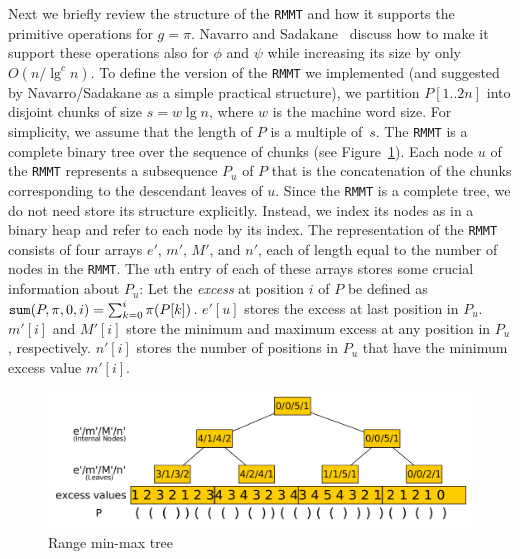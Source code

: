 Next we briefly review the structure of the {\tt RMMT} and how it supports
the primitive operations for $g = \pi$.
Navarro and Sadakane~\cite{Navarro:2014:FFS:2620785.2601073} discuss how
to make it support these operations also for $\phi$ and $\psi$ while increasing
its size by only $O(n/\lg^c n)$.
To define the version of the {\tt RMMT} we implemented (and suggested by
Navarro/Sadakane as a simple practical structure), we partition $P[1..2n]$ into
disjoint chunks of size $s = w \lg n$, where $w$ is the machine word size.
For simplicity, we assume that the length of $P$ is a multiple of~$s$.
The {\tt RMMT} is a complete binary tree over the sequence of chunks
(see Figure~\ref{fig:RangeMinMaxTree}).
Each node $u$ of the {\tt RMMT} represents a subsequence $P_u$ of $P$ that is
the concatenation of the chunks corresponding to the descendant leaves of $u$.
Since the {\tt RMMT} is a complete tree, we do not need store its structure
explicitly.
Instead, we index its nodes as in a binary heap and refer to each node by
its index.
The representation of the {\tt RMMT} consists of four arrays $e'$, $m'$,
$M'$, and $n'$, each of length equal to the number of nodes in the {\tt RMMT}.
The $u$th entry of each of these arrays stores some crucial information about
$P_u$:
Let the {\em excess} at position $i$ of $P$ be defined as $\mathtt{sum}(P,\pi,0,i) =
\sum_{k=0}^{i} \pi(P[k])$.
$e'[u]$ stores the excess at last position in $P_u$.
$m'[i]$ and $M'[i]$ store the minimum and maximum excess at any position in
$P_u$, respectively.
$n'[i]$ stores the number of positions in $P_u$ that have the minimum excess
value $m'[i]$.

\begin{figure}[t]
  \centering
  \includegraphics[scale=0.26]{./images/Range-min-max-tree.png}
  \caption{Range min-max tree}
  \label{fig:RangeMinMaxTree}
\end{figure}

